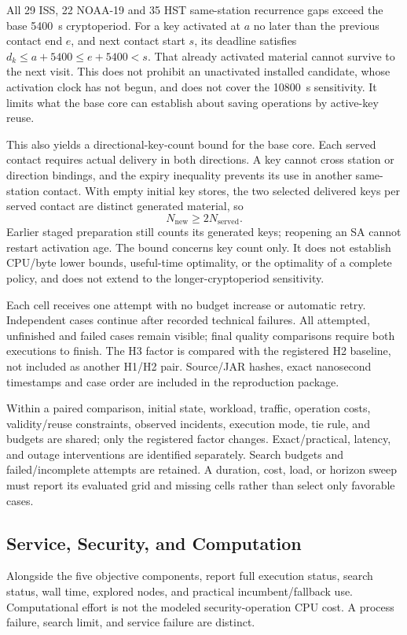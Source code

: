 \documentclass[conference]{IEEEtran}
\begin{document}
All 29 ISS, 22 NOAA-19 and 35 HST same-station recurrence gaps exceed the base 5400~s cryptoperiod. For a key activated at $a$ no later than the previous contact end $e$, and next contact start $s$, its deadline satisfies $d_k\leq a+5400\leq e+5400<s$. That already activated material cannot survive to the next visit. This does not prohibit an unactivated installed candidate, whose activation clock has not begun, and does not cover the 10800~s sensitivity. It limits what the base core can establish about saving operations by active-key reuse.

This also yields a directional-key-count bound for the base core. Each served contact requires actual delivery in both directions. A key cannot cross station or direction bindings, and the expiry inequality prevents its use in another same-station contact. With empty initial key stores, the two selected delivered keys per served contact are distinct generated material, so
\begin{equation}
N_{\mathrm{new}}\geq 2N_{\mathrm{served}}.
\label{eq:key-bound}
\end{equation}
Earlier staged preparation still counts its generated keys; reopening an SA cannot restart activation age. The bound concerns key count only. It does not establish CPU/byte lower bounds, useful-time optimality, or the optimality of a complete policy, and does not extend to the longer-cryptoperiod sensitivity.

Each cell receives one attempt with no budget increase or automatic retry. Independent cases continue after recorded technical failures. All attempted, unfinished and failed cases remain visible; final quality comparisons require both executions to finish. The H3 factor is compared with the registered H2 baseline, not included as another H1/H2 pair. Source/JAR hashes, exact nanosecond timestamps and case order are included in the reproduction package.

Within a paired comparison, initial state, workload, traffic, operation costs, validity/reuse constraints, observed incidents, execution mode, tie rule, and budgets are shared; only the registered factor changes. Exact/practical, latency, and outage interventions are identified separately. Search budgets and failed/incomplete attempts are retained. A duration, cost, load, or horizon sweep must report its evaluated grid and missing cells rather than select only favorable cases.

\subsection{Service, Security, and Computation}
Alongside the five objective components, report full execution status, search status, wall time, explored nodes, and practical incumbent/fallback use. Computational effort is not the modeled security-operation CPU cost. A process failure, search limit, and service failure are distinct.
\end{document}
